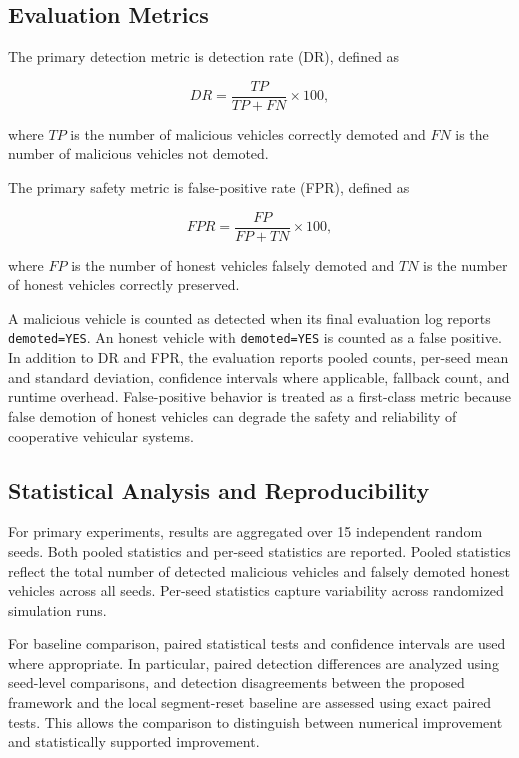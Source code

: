 \documentclass[journal]{IEEEtran}
\begin{document}
\subsection{Evaluation Metrics}
\label{subsec:evaluation_metrics}

The primary detection metric is detection rate (DR), defined as

\begin{equation}
DR = \frac{TP}{TP+FN} \times 100,
\label{eq:dr}
\end{equation}

where $TP$ is the number of malicious vehicles correctly demoted and $FN$ is the number of malicious vehicles not demoted.

The primary safety metric is false-positive rate (FPR), defined as

\begin{equation}
FPR = \frac{FP}{FP+TN} \times 100,
\label{eq:fpr}
\end{equation}

where $FP$ is the number of honest vehicles falsely demoted and $TN$ is the number of honest vehicles correctly preserved.

A malicious vehicle is counted as detected when its final evaluation log
reports \texttt{demoted=YES}. An honest vehicle with \texttt{demoted=YES} is
counted as a false positive. In addition to DR and FPR, the evaluation reports
pooled counts, per-seed mean and standard deviation, confidence intervals where
applicable, fallback count, and runtime overhead. False-positive behavior is
treated as a first-class metric because false demotion of honest vehicles can
degrade the safety and reliability of cooperative vehicular systems.

\subsection{Statistical Analysis and Reproducibility}
\label{subsec:statistical_analysis}

For primary experiments, results are aggregated over 15 independent random seeds. Both pooled statistics and per-seed statistics are reported. Pooled statistics reflect the total number of detected malicious vehicles and falsely demoted honest vehicles across all seeds. Per-seed statistics capture variability across randomized simulation runs.

For baseline comparison, paired statistical tests and confidence intervals are used where appropriate. In particular, paired detection differences are analyzed using seed-level comparisons, and detection disagreements between the proposed framework and the local segment-reset baseline are assessed using exact paired tests. This allows the comparison to distinguish between numerical improvement and statistically supported improvement.
\end{document}
